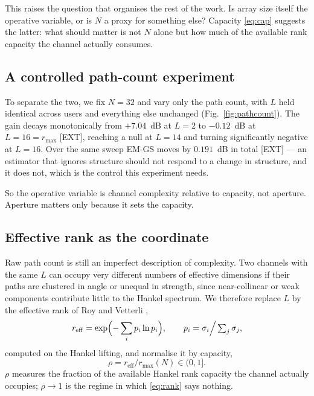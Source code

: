 \documentclass[conference]{IEEEtran}
\newcommand{\rmax}{r_{\max}}
\newcommand{\reff}{r_{\mathrm{eff}}}
\begin{document}
This raises the question that organises the rest of the work. Is array size
itself the operative variable, or is $N$ a proxy for something else? Capacity
\eqref{eq:cap} suggests the latter: what should matter is not $N$ alone but how
much of the available rank capacity the channel actually consumes.

\subsection{A controlled path-count experiment}

To separate the two, we fix $N=32$ and vary only the path count, with $L$ held
identical across users and everything else unchanged
(Fig.~\ref{fig:pathcount}). The gain decays monotonically from
$+7.04$~dB at $L=2$ to $-0.12$~dB at $L=16=\rmax$ [EXT], reaching a null at
$L=14$ and turning significantly negative at $L=16$. Over the same sweep EM-GS
moves by $0.191$~dB in total [EXT] --- an estimator that ignores structure
should not respond to a change in structure, and it does not, which is the
control this experiment needs.

So the operative variable is channel complexity relative to capacity, not
aperture. Aperture matters only because it sets the capacity.

\subsection{Effective rank as the coordinate}

Raw path count is still an imperfect description of complexity. Two channels
with the same $L$ can occupy very different numbers of effective dimensions if
their paths are clustered in angle or unequal in strength, since near-collinear
or weak components contribute little to the Hankel spectrum. We therefore
replace $L$ by the effective rank of Roy and Vetterli \cite{royvetterli2007},
\begin{equation}\label{eq:reff}
\reff=\exp\Bigl(-\sum_i p_i\ln p_i\Bigr),\qquad
p_i=\sigma_i\Big/\textstyle\sum_j\sigma_j,
\end{equation}
computed on the Hankel lifting, and normalise it by capacity,
\begin{equation}\label{eq:rho}
\rho=\reff/\rmax(N)\in(0,1].
\end{equation}
$\rho$ measures the fraction of the available Hankel rank capacity the channel
actually occupies; $\rho\to1$ is the regime in which \eqref{eq:rank} says
nothing.
\end{document}
